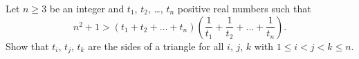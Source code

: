 Let $n \ge 3$ be an integer
and $t_1$, $t_2$, \dots, $t_n$ positive real numbers such that
\[ n^2+1 > \left(t_1 + t_2 + \dots + t_n\right)
  \left( \frac{1}{t_1} + \frac{1}{t_2} + \dots + \frac{1}{t_n} \right). \]
Show that $t_i$, $t_j$, $t_k$ are the sides of a triangle
for all $i$, $j$, $k$ with $1 \le i < j < k \le n$.